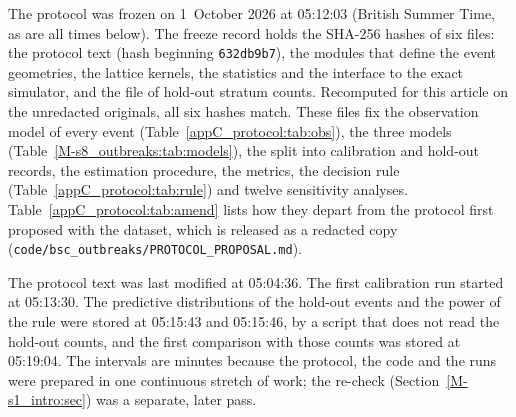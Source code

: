 The protocol was frozen on 1~October 2026 at 05:12:03 (British Summer Time, as are all times below). The
freeze record holds the SHA-256 hashes of six files: the protocol text (hash beginning \texttt{632db9b7}), the
modules that define the event geometries, the lattice kernels, the statistics and the interface to the exact
simulator, and the file of hold-out stratum counts. Recomputed for this article on the unredacted originals,
all six hashes match.
These files fix the observation model of every event (Table~\ref{appC_protocol:tab:obs}), the three models
(Table~\ref{M-s8_outbreaks:tab:models}), the split into calibration and hold-out records, the estimation
procedure, the metrics, the decision rule (Table~\ref{appC_protocol:tab:rule}) and twelve sensitivity
analyses. Table~\ref{appC_protocol:tab:amend} lists how they depart from the protocol first proposed with the
dataset, which is released as a redacted copy (\texttt{code/bsc\_outbreaks/PROTOCOL\_PROPOSAL.md}).

The protocol text was last modified at 05:04:36. The first calibration run started at 05:13:30. The predictive
distributions of the hold-out events and the power of the rule were stored at 05:15:43 and 05:15:46, by a
script that does not read the hold-out counts, and the first comparison with those counts was stored at
05:19:04. The intervals are minutes because the protocol, the code and the runs were prepared in one
continuous stretch of work; the re-check (Section~\ref{M-s1_intro:sec}) was a separate, later pass.

